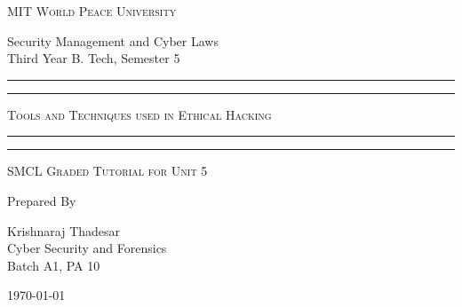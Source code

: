 \documentclass[11pt]{article}
\begin{document}
\begin{titlepage}
    \centering


    \huge\textsc{
        MIT World Peace University
    }\\

    \vspace{0.75\baselineskip} %

    \LARGE{
        Security Management and Cyber Laws\\
        Third Year B. Tech, Semester 5
    }

    \vfill %


    \rule{\textwidth}{1.6pt}\vspace*{-\baselineskip}\vspace*{2pt}
    \rule{\textwidth}{0.6pt}
    \vspace{0.75\baselineskip} %



    \huge{\textsc{
            Tools and Techniques used in Ethical Hacking
        }} \\



    \vspace{0.5\baselineskip} %
    \rule{\textwidth}{0.6pt}\vspace*{-\baselineskip}\vspace*{2.8pt}
    \rule{\textwidth}{1.6pt}

    \vspace{1\baselineskip} %


    \LARGE\textsc{
        SMCL Graded Tutorial for Unit 5
    } %
    \vfill


    Prepared By
    \vspace{0.5\baselineskip} %

    \Large{
        Krishnaraj Thadesar \\
        Cyber Security and Forensics\\
        Batch A1, PA 10
    }


    \vspace{0.5\baselineskip} %
    \today

\end{titlepage}
\end{document}
